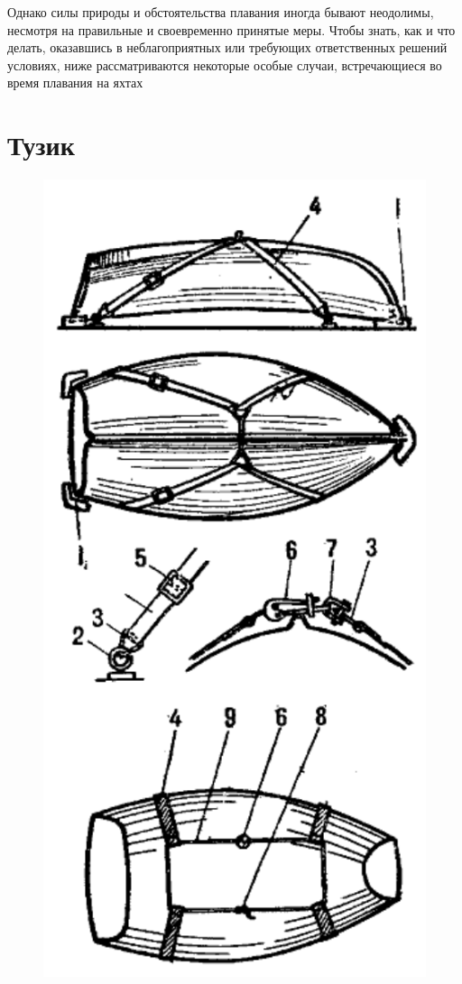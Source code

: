 \documentclass[a4paper, 12pt, twoside, final]{scrbook}
\begin{document}
Однако силы природы и обстоятельства плавания иногда бывают неодолимы, несмотря на правильные и своевременно принятые меры. Чтобы знать, как и что делать, оказавшись в неблагоприятных или требующих ответственных решений условиях, ниже рассматриваются некоторые особые случаи, встречающиеся во время плавания на яхтах

\section{Тузик}

\begin{figure}
	\centering
	\includegraphics[scale=1]{132_Kreplenie_tuzika}

\end{figure}
\end{document}
